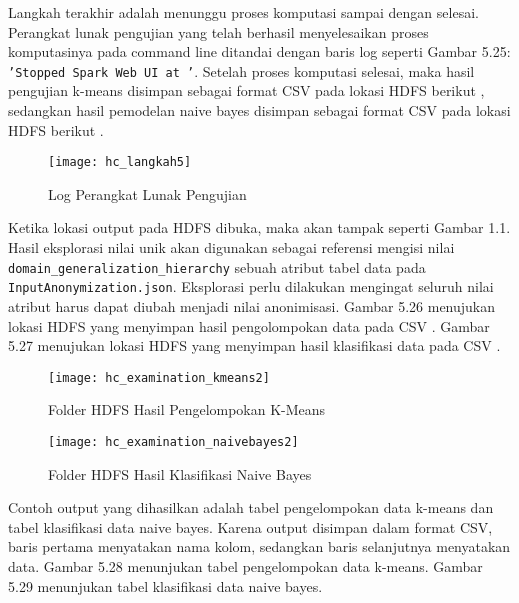 \vspace{0.3cm}
Langkah terakhir adalah menunggu proses komputasi sampai dengan selesai.  Perangkat lunak pengujian yang telah berhasil menyelesaikan proses komputasinya  pada command line ditandai dengan baris log seperti Gambar 5.25: \texttt{'Stopped Spark Web UI at '}. Setelah proses komputasi selesai, maka hasil pengujian k-means disimpan sebagai format CSV pada lokasi HDFS berikut , sedangkan hasil pemodelan naive bayes disimpan sebagai format CSV pada lokasi HDFS berikut .

\begin{figure}[H]
	\centering
	\texttt{[image: hc\_langkah5]}
	\caption{Log Perangkat Lunak Pengujian}
	\label{fig:pertama2}
\end{figure}

Ketika lokasi output pada HDFS dibuka, maka akan tampak seperti Gambar 1.1. Hasil eksplorasi nilai unik akan digunakan sebagai referensi mengisi nilai \texttt{domain\_generalization\_hierarchy} sebuah atribut tabel data pada \texttt{InputAnonymization.json}. Eksplorasi perlu dilakukan mengingat seluruh nilai atribut harus dapat diubah menjadi nilai anonimisasi. Gambar 5.26 menujukan lokasi HDFS yang menyimpan hasil pengolompokan data pada CSV . Gambar 5.27 menujukan lokasi HDFS yang menyimpan hasil klasifikasi data pada CSV .

\begin{figure}[H]
	\centering
	\texttt{[image: hc\_examination\_kmeans2]}
	\caption{Folder HDFS Hasil Pengelompokan K-Means}
	\label{fig:pertama2}
\end{figure}

\begin{figure}[H]
	\centering
	\texttt{[image: hc\_examination\_naivebayes2]}
	\caption{Folder HDFS Hasil Klasifikasi Naive Bayes}
	\label{fig:pertama2}
\end{figure}

Contoh output yang dihasilkan adalah tabel pengelompokan data k-means dan tabel klasifikasi data naive bayes. Karena output disimpan dalam format CSV, baris pertama menyatakan nama kolom, sedangkan baris selanjutnya menyatakan data. Gambar 5.28 menunjukan tabel pengelompokan data k-means. Gambar 5.29 menunjukan tabel klasifikasi data naive bayes.

